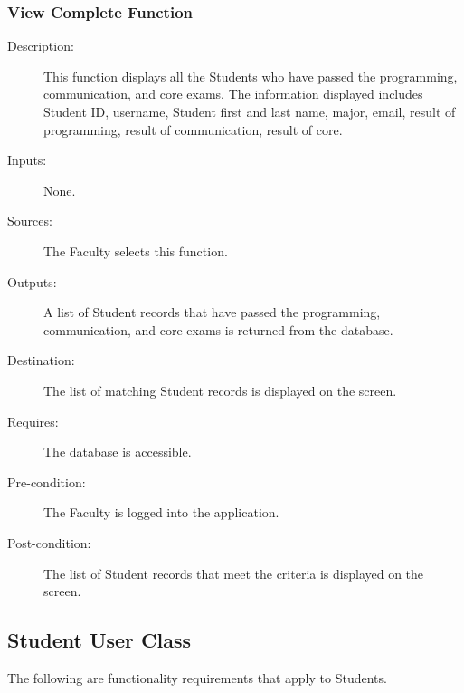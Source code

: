\subsubsection{\large View Complete Function}  
\begin{boxed} %
\small\begin{description}
\item[Description:]
   This function displays all the Students who have passed the programming,
   communication, and core exams. The information displayed includes Student ID,
   username, Student first and last name, major, email, result of programming,
   result of communication, result of core.
\item[Inputs:]
   None.
\item[Sources:]
   The Faculty selects this function.
\item[Outputs:]
   A list of Student records that have passed the programming,
   communication, and core exams is returned from the database.
\item[Destination:]
   The list of matching Student records is displayed on the screen.
\item[Requires:]
   The database is accessible.
\item[Pre-condition:]
   The Faculty is logged into the application.
\item[Post-condition:]
   The list of Student records that meet the criteria is displayed on the
   screen.
\end{description}
\normalsize
\end{boxed} %

\subsection{Student User Class}
The following are functionality requirements that apply to Students.

